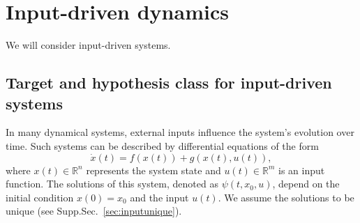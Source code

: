 \documentclass{article}
\newcommand{\reals}{\mathbb{R}}
\newcounter{ct}
\begin{document}





\section{Input-driven dynamics}\label{sec:inputdriven}
We will consider input-driven systems.  %

\subsection{Target and hypothesis class for input-driven systems}\label{sec:inputdriven}
In many dynamical systems, external inputs influence the system's evolution over time. Such systems can be described by differential equations of the form
\begin{equation}\label{eq:inputdriven}
\dot x(t) = f(x(t)) + g(x(t),u(t)),
\end{equation}
where $x(t)\in\reals^n$  represents the system state and $u(t)\in\reals^m$ is an input function.
The solutions of this system, denoted as $\psi(t,x_0,u)$, depend on the initial condition $x(0) = x_0$  and the input $u(t)$.
We assume the solutions to be unique (see Supp.Sec.~\ref{sec:inputunique}).






%

\end{document}
